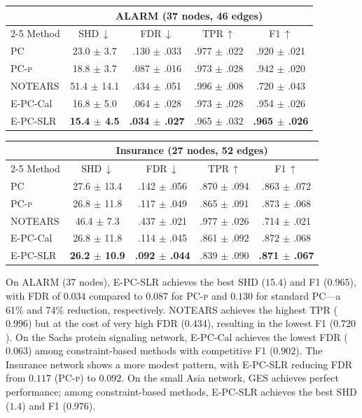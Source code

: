 \documentclass[11pt]{article}
\newcommand{\epc}{\textsc{E-PC}}
\newcommand{\pcp}{\textsc{PC-p}}
\begin{document}
\begin{table}[t]
\vspace{0.5em}

\begin{tabular}{l cccc}
\toprule
 & \multicolumn{4}{c}{ALARM (37 nodes, 46 edges)} \\
\cmidrule(lr){2-5}
Method & SHD\,$\downarrow$ & FDR\,$\downarrow$ & TPR\,$\uparrow$ & F1\,$\uparrow$ \\
\midrule
PC & 23.0 $\pm$ 3.7 & .130 $\pm$ .033 & .977 $\pm$ .022 & .920 $\pm$ .021 \\
\pcp{} & 18.8 $\pm$ 3.7 & .087 $\pm$ .016 & .973 $\pm$ .028 & .942 $\pm$ .020 \\
NOTEARS & 51.4 $\pm$ 14.1 & .434 $\pm$ .051 & .996 $\pm$ .008 & .720 $\pm$ .043 \\
\epc{}-Cal & 16.8 $\pm$ 5.0 & .064 $\pm$ .028 & .973 $\pm$ .028 & .954 $\pm$ .026 \\
\epc{}-SLR & \textbf{15.4 $\pm$ 4.5} & \textbf{.034 $\pm$ .027} & .965 $\pm$ .032 & \textbf{.965 $\pm$ .026} \\
\bottomrule
\end{tabular}

\vspace{0.5em}

\begin{tabular}{l cccc}
\toprule
 & \multicolumn{4}{c}{Insurance (27 nodes, 52 edges)} \\
\cmidrule(lr){2-5}
Method & SHD\,$\downarrow$ & FDR\,$\downarrow$ & TPR\,$\uparrow$ & F1\,$\uparrow$ \\
\midrule
PC & 27.6 $\pm$ 13.4 & .142 $\pm$ .056 & .870 $\pm$ .094 & .863 $\pm$ .072 \\
\pcp{} & 26.8 $\pm$ 11.8 & .117 $\pm$ .049 & .865 $\pm$ .091 & .873 $\pm$ .068 \\
NOTEARS & 46.4 $\pm$ 7.3 & .437 $\pm$ .021 & .977 $\pm$ .026 & .714 $\pm$ .021 \\
\epc{}-Cal & 26.8 $\pm$ 11.8 & .114 $\pm$ .045 & .861 $\pm$ .092 & .872 $\pm$ .068 \\
\epc{}-SLR & \textbf{26.2 $\pm$ 10.9} & \textbf{.092 $\pm$ .044} & .839 $\pm$ .090 & \textbf{.871 $\pm$ .067} \\
\bottomrule
\end{tabular}
\end{table}

On ALARM (37 nodes), \epc{}-SLR achieves the best SHD ($15.4$) and F1 ($0.965$), with FDR of $0.034$ compared to $0.087$ for \pcp{} and $0.130$ for standard PC---a 61\% and 74\% reduction, respectively. NOTEARS achieves the highest TPR ($0.996$) but at the cost of very high FDR ($0.434$), resulting in the lowest F1 ($0.720$). On the Sachs protein signaling network, \epc{}-Cal achieves the lowest FDR ($0.063$) among constraint-based methods with competitive F1 ($0.902$). The Insurance network shows a more modest pattern, with \epc{}-SLR reducing FDR from $0.117$ (\pcp{}) to $0.092$. On the small Asia network, GES achieves perfect performance; among constraint-based methods, \epc{}-SLR achieves the best SHD ($1.4$) and F1 ($0.976$).
\end{document}
